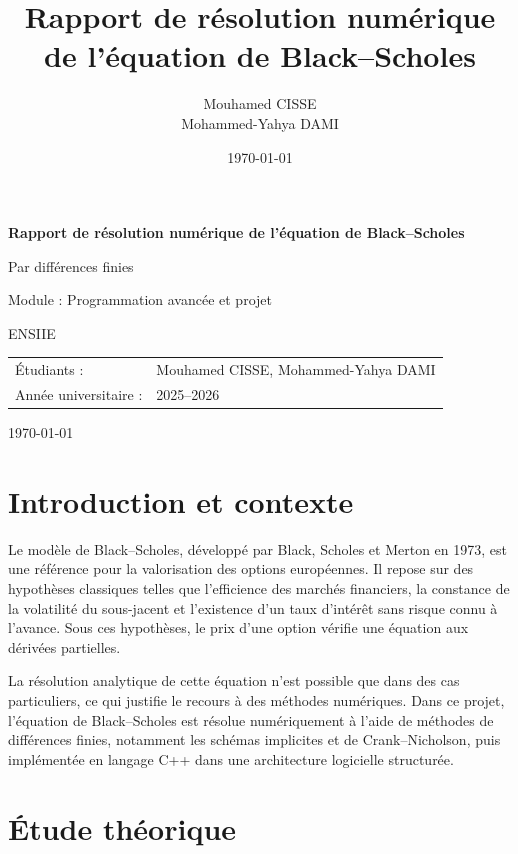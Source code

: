 \documentclass[12pt,a4paper]{article}
\title{Rapport de résolution numérique de l’équation de Black--Scholes}
\author{Mouhamed CISSE \\ Mohammed-Yahya DAMI}
\date{\today}
\begin{document}
\begin{titlepage}
\centering
\vspace*{2cm}
{\LARGE\bfseries Rapport de résolution numérique de l’équation de Black--Scholes\par}
\vspace{0.5cm}
{\Large Par différences finies\par}
\vspace{2cm}
{\large Module : Programmation avancée et projet\par}
{\large ENSIIE\par}

\vspace{1.5cm}

\begin{tabular}{ll}
Étudiants : & Mouhamed CISSE, Mohammed-Yahya DAMI \\
Année universitaire : & 2025--2026
\end{tabular}

\vfill
{\large \today\par}
\end{titlepage}

\tableofcontents
\newpage

\section{Introduction et contexte}

Le modèle de Black--Scholes, développé par Black, Scholes et Merton en 1973, est une
référence pour la valorisation des options européennes. Il repose sur des hypothèses
classiques telles que l’efficience des marchés financiers, la constance de la
volatilité du sous-jacent et l’existence d’un taux d’intérêt sans risque connu à
l’avance. Sous ces hypothèses, le prix d’une option vérifie une équation aux dérivées
partielles.

La résolution analytique de cette équation n’est possible que dans des cas
particuliers, ce qui justifie le recours à des méthodes numériques. Dans ce projet,
l’équation de Black--Scholes est résolue numériquement à l’aide de méthodes de
différences finies, notamment les schémas implicites et de Crank--Nicholson, puis
implémentée en langage C++ dans une architecture logicielle structurée.

\section{Étude théorique}
\end{document}
